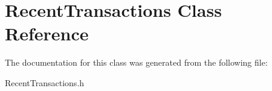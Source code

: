 \hypertarget{interface_recent_transactions}{
\section{RecentTransactions Class Reference}
\label{interface_recent_transactions}
}


The documentation for this class was generated from the following file:\begin{DoxyCompactItemize}
\item 
RecentTransactions.h\end{DoxyCompactItemize}
